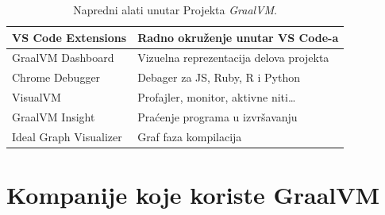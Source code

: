 \documentclass[a4paper]{article}
\begin{document}
\begin{table}
    \centering
    \begin{tabular}{|l|l|}
        \hline
        VS Code Extensions & Radno okruženje unutar VS Code-a\\
        \hline
        GraalVM Dashboard & Vizuelna reprezentacija delova projekta\\
        \hline
        Chrome Debugger & Debager za JS, Ruby, R i Python\\
        \hline
        VisualVM & Profajler, monitor, aktivne niti\ldots\\
        \hline
        GraalVM Insight & Praćenje programa u izvršavanju\\
        \hline
        Ideal Graph Visualizer & Graf faza kompilacija\\
        \hline
    \end{tabular}
    \caption{Napredni alati unutar Projekta \emph{GraalVM}.}
    \label{alati}
\end{table}

\section{Kompanije koje koriste GraalVM}
\label{sec:comp}
\end{document}
